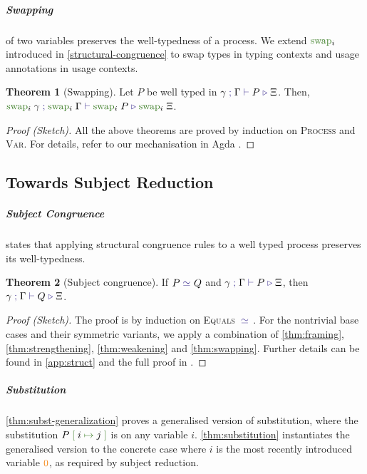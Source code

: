 \documentclass[a4paper,UKenglish,cleveref,autoref,thm-restate,authorcolumns]{lipics-v2019}
\theoremstyle{definition}
\newtheorem{nitheorem}{Theorem}
\newcommand{\type}[1]{\textcolor{BlueViolet}{\operatorname{#1}}}
\newcommand{\constr}[1]{\textcolor{BurntOrange}{\operatorname{#1}}}
\newcommand{\func}[1]{\textcolor{OliveGreen}{\operatorname{#1}}}
\newcommand{\subst}[3]{#1 \; \func{[} \; #3 \; \func{\mapsto} \;#2 \; \func{]}}
\newcommand{\types}[4]{#1 \; \type{;} \; #2 \; \type{\vdash} \; #3 \; \type{\triangleright} \; #4}
\newcommand{\eq}[1]{\; \type{\simeq}_{#1} \;}
\begin{document}
\subparagraph*{Swapping}
of two variables preserves the well-typedness of a process.
We extend $\func{swap}_i$  introduced in \autoref{structural-congruence} to swap types in typing contexts and usage annotations in usage contexts.
\begin{nitheorem}[Swapping]
  \label{thm:swapping}
  Let $P$ be well typed in $\types{\gamma}{\Gamma}{P}{\Xi}$.
  Then, $\types{\func{swap}_i \; \gamma}{\func{swap}_i \; \Gamma}{\allowbreak \func{swap}_i \; P}{\func{swap}_i \; \Xi}$.
\end{nitheorem}

\begin{proof}[Proof (Sketch)]
  All the above theorems are proved by induction on \textsc{Process} and \textsc{Var}.
  For details, refer to our mechanisation in Agda \cite{Zalakain2020Agda}.
\end{proof}

\subsection{Towards Subject Reduction}
\subparagraph*{Subject Congruence}
states that applying structural congruence rules to a well typed process preserves its well-typedness.

\begin{nitheorem}[Subject congruence]
  \label{thm:subject-congruence}
  If $P \eq{} Q$ and $\types{\gamma}{\Gamma}{P}{\Xi}$, then $\types{\gamma}{\Gamma}{Q}{\Xi}$.
\end{nitheorem}

\begin{proof}[Proof (Sketch)]
  The proof is by induction on \textsc{Equals} $\eq{}$.
  For the nontrivial base cases and their symmetric variants, we apply a combination of \autoref{thm:framing}, \autoref{thm:strengthening}, \autoref{thm:weakening} and \autoref{thm:swapping}.
  Further details can be found in \autoref{app:struct} and the full proof in \cite{Zalakain2020Agda}.
\end{proof}

\subparagraph*{Substitution}
\autoref{thm:subst-generalization} proves a generalised version of substitution, where the substitution $\subst{P}{j}{i}$ is on any variable $i$.
\autoref{thm:substitution} instantiates the generalised version to the concrete case where $i$ is the most recently introduced variable $\constr{0}$, as required by subject reduction.
\end{document}
